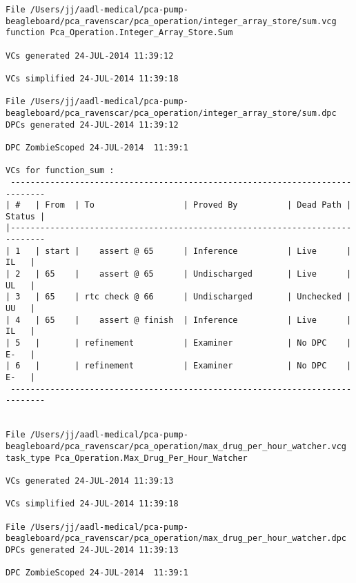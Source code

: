 \begin{lstlisting}[frame=single, gobble=0, caption={POGS report for PCA Pump prototype}]
File /Users/jj/aadl-medical/pca-pump-beagleboard/pca_ravenscar/pca_operation/integer_array_store/sum.vcg
function Pca_Operation.Integer_Array_Store.Sum

VCs generated 24-JUL-2014 11:39:12

VCs simplified 24-JUL-2014 11:39:18

File /Users/jj/aadl-medical/pca-pump-beagleboard/pca_ravenscar/pca_operation/integer_array_store/sum.dpc
DPCs generated 24-JUL-2014 11:39:12

DPC ZombieScoped 24-JUL-2014  11:39:1

VCs for function_sum :
 -----------------------------------------------------------------------------
| #   | From  | To                  | Proved By          | Dead Path | Status |
|-----------------------------------------------------------------------------
| 1   | start |    assert @ 65      | Inference          | Live      |   IL   |
| 2   | 65    |    assert @ 65      | Undischarged       | Live      |   UL   |
| 3   | 65    | rtc check @ 66      | Undischarged       | Unchecked |   UU   |
| 4   | 65    |    assert @ finish  | Inference          | Live      |   IL   |
| 5   |       | refinement          | Examiner           | No DPC    |   E-   |
| 6   |       | refinement          | Examiner           | No DPC    |   E-   |
 -----------------------------------------------------------------------------


File /Users/jj/aadl-medical/pca-pump-beagleboard/pca_ravenscar/pca_operation/max_drug_per_hour_watcher.vcg
task_type Pca_Operation.Max_Drug_Per_Hour_Watcher

VCs generated 24-JUL-2014 11:39:13

VCs simplified 24-JUL-2014 11:39:18

File /Users/jj/aadl-medical/pca-pump-beagleboard/pca_ravenscar/pca_operation/max_drug_per_hour_watcher.dpc
DPCs generated 24-JUL-2014 11:39:13

DPC ZombieScoped 24-JUL-2014  11:39:1


\end{lstlisting}
